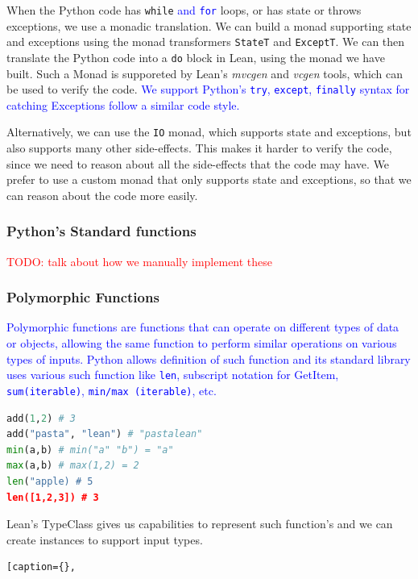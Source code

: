 \documentclass{article}
\newcommand{\code}{\lstinline}
\newcommand{\todo}[1]{\textcolor{red}{TODO: #1}}
\newcommand{\suggest}[1]{\textcolor{blue}{#1}}
\begin{document}
{When the Python code has \code{while} \suggest{and \code{for}} loops, or has state or throws exceptions, we use a monadic translation. We can build a monad supporting state and exceptions using the monad transformers \code{StateT} and \code{ExceptT}. We can then translate the Python code into a \code{do} block in Lean, using the monad we have built. Such a Monad is supporeted by Lean's \emph{mvcgen} and \emph{vcgen} tools, which can be used to verify the code. \suggest{We support Python's \code{try}, \code{except}, \code{finally} syntax for catching Exceptions follow a similar code style.}

Alternatively, we can use the \code{IO} monad, which supports state and exceptions, but also supports many other side-effects. This makes it harder to verify the code, since we need to reason about all the side-effects that the code may have. We prefer to use a custom monad that only supports state and exceptions, so that we can reason about the code more easily.

\subsubsection{Python's Standard functions}

\todo{talk about how we manually implement these}

\subsubsection{Polymorphic Functions}

\suggest{
Polymorphic functions are functions that can operate on different types of data or objects, allowing the same function to perform similar operations on various types of inputs. Python allows definition of such function and its standard library uses various such function like \code{len}, subscript notation for GetItem, \code{sum(iterable)}, \code{min/max (iterable)}, etc.
}

\begin{lstlisting}[language=python, caption={Polymorphic Function Examples.}, label={lst:polyeg}, breaklines=true]
add(1,2) # 3
add("pasta", "lean") # "pastalean"
min(a,b) # min("a" "b") = "a"
max(a,b) # max(1,2) = 2
len("apple) # 5
len([1,2,3]) # 3
\end{lstlisting}

Lean's TypeClass gives us capabilities to represent such function's and we can create instances to support input types. 

\begin{lstlisting}[caption={}, 
\end{lstlisting}


}
\end{document}
